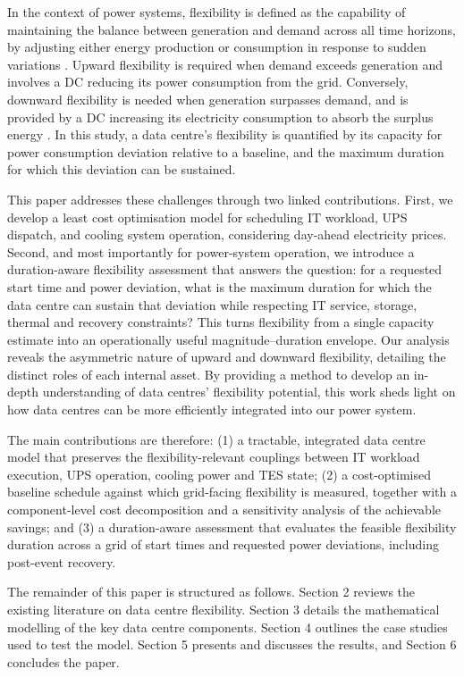 \documentclass[lettersize,journal]{IEEEtran}
\newcommand{\rev}[1]{\textcolor{blue!70!black}{#1}}
\begin{document}
In the context of power systems, flexibility is defined as the capability of maintaining the balance between generation and demand across all time horizons, by adjusting either energy production or consumption in response to sudden variations \cite{Centrica2020LEM, EEAACER2023Flex, neso2025future, Nosair2015TSTE}. Upward flexibility is required when demand exceeds generation and involves a DC reducing its power consumption from the grid. Conversely, downward flexibility is needed when generation surpasses demand, and is provided by a DC increasing its electricity consumption to absorb the surplus energy \cite{Centrica2020LEM, NG2017SNAPS}. In this study, a data centre's flexibility is quantified by its capacity for power consumption deviation relative to a baseline, and the maximum duration for which this deviation can be sustained.

\rev{This paper addresses these challenges through two linked contributions. First, we develop a least cost optimisation model for scheduling IT workload, UPS dispatch, and cooling system operation, considering day-ahead electricity prices. Second, and most importantly for power-system operation, we introduce a duration-aware flexibility assessment that answers the question: for a requested start time and power deviation, what is the maximum duration for which the data centre can sustain that deviation while respecting IT service, storage, thermal and recovery constraints? This turns flexibility from a single capacity estimate into an operationally useful magnitude--duration envelope.} Our analysis reveals the asymmetric nature of upward and downward flexibility, detailing the distinct roles of each internal asset. By providing a method to develop an in-depth understanding of data centres' flexibility potential, this work sheds light on how data centres can be more efficiently integrated into our power system.

\rev{The main contributions are therefore: (1) a tractable, integrated data centre model that preserves the flexibility-relevant couplings between IT workload execution, UPS operation, cooling power and TES state; (2) a cost-optimised baseline schedule against which grid-facing flexibility is measured, together with a component-level cost decomposition and a sensitivity analysis of the achievable savings; and (3) a duration-aware assessment that evaluates the feasible flexibility duration across a grid of start times and requested power deviations, including post-event recovery.}

The remainder of this paper is structured as follows. Section 2 reviews the existing literature on data centre flexibility. Section 3 details the mathematical modelling of the key data centre components. Section 4 outlines the case studies used to test the model. Section 5 presents and discusses the results, and Section 6 concludes the paper. 
\end{document}
